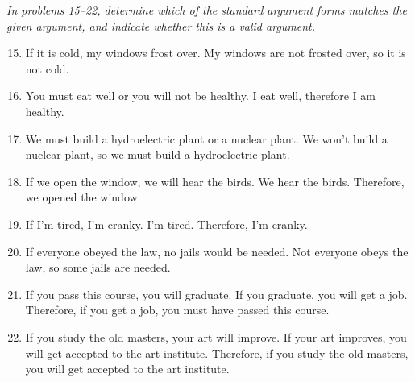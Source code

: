 \emph{In problems 15--22, determine which of the standard argument forms matches the given argument, and indicate whether this is a valid argument.}
\begin{enumerate}
\setcounter{enumi}{14}

\item If it is cold, my windows frost over.  My windows are not frosted over, so it is not cold. 

\item You must eat well or you will not be healthy.  I eat well, therefore I am healthy. 

\item We must build a hydroelectric plant or a nuclear plant.  We won't build a nuclear plant, so we must build a hydroelectric plant. 

\item If we open the window, we will hear the birds.  We hear the birds.  Therefore, we opened the window. 

\item If I'm tired, I'm cranky.  I'm tired.  Therefore, I'm cranky. 

\item If everyone obeyed the law, no jails would be needed.  Not everyone obeys the law, so some jails are needed. 

\item If you pass this course, you will graduate.  If you graduate, you will get a job.  Therefore, if you get a job, you must have passed this course. 

\item If you study the old masters, your art will improve.  If your art improves, you will get accepted to the art institute.  Therefore, if you study the old masters, you will get accepted to the art institute. 
\end{enumerate}